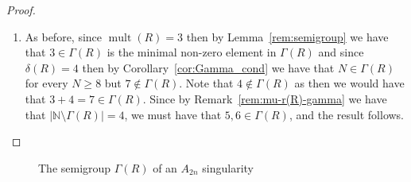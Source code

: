 \documentclass{article}
\DeclareMathOperator{\mult}{mult}
\numberwithin{theorem}{section}
\begin{document}
\begin{proof}
\begin{enumerate}
        \item As before, since $\mult(R)=3$ then by Lemma~\ref{rem:semigroup} we have that $3 \in \Gamma(R)$ is the minimal non-zero element in $\Gamma(R)$ and since $\delta(R)=4$ then by Corollary~\ref{cor:Gamma_cond} we have that $N \in \Gamma(R)$ for every $N \geq 8$ but $7 \notin \Gamma(R)$. Note that $4 \notin \Gamma(R)$ as then we would have that $3+4=7 \in \Gamma(R)$. Since by Remark~\ref{rem:mu-r(R)-gamma} we have that $|\mathbb{N} \setminus \Gamma(R)|=4$, we must have that $5,6 \in \Gamma(R)$, and the result follows.  
    \end{enumerate}
\end{proof}


\begin{figure}[ht]
\centering


\caption{The semigroup $\Gamma(R)$ of an $A_{2n}$ singularity}
    \end{figure}
    
\end{document}
